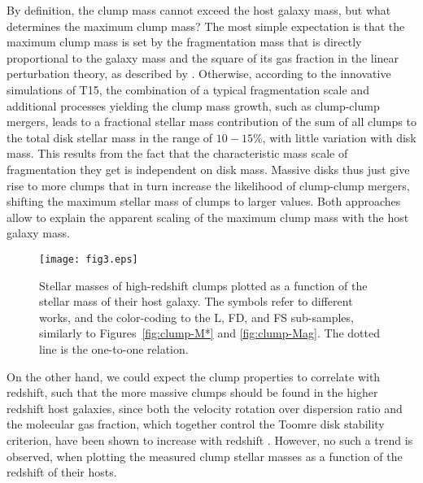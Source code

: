 \documentclass[twocolumn]{aastex61}
\begin{document}
By definition, the clump mass cannot exceed the host galaxy mass, but what 
determines the maximum clump mass? The most simple expectation is that the 
maximum clump mass is set by the fragmentation mass that is directly 
proportional to the galaxy mass and the square of its gas fraction in the linear 
perturbation theory, as described by \citet{escala08}. Otherwise, according to 
the innovative simulations of T15, the combination of a typical fragmentation 
scale and additional processes yielding the clump mass growth, such as 
clump-clump mergers, leads to a fractional stellar mass contribution of the sum 
of all clumps to the total disk stellar mass in the range of $10-15$\%, with 
little variation with disk mass. 
This results from the fact that the characteristic mass scale of fragmentation 
they get is independent on disk mass. 
Massive disks thus just give rise to more clumps that in turn increase the 
likelihood of clump-clump mergers, shifting the maximum stellar mass of clumps 
to larger values. 
Both approaches allow to explain the apparent scaling of the maximum clump 
mass with the host galaxy mass.

%

\begin{figure}
\centering
\texttt{[image: fig3.eps]}\hspace{1cm}
\caption{Stellar masses of high-redshift clumps plotted as a function of the stellar mass of their host galaxy. The symbols refer to different works, and the color-coding to the L, FD, and FS sub-samples, similarly to Figures~\ref{fig:clump-M*} and \ref{fig:clump-Mag}. The dotted line is the one-to-one relation.}
\label{fig:clump-host}
\end{figure}
%

On the other hand, we could expect the clump properties to correlate with 
redshift, such that the more massive clumps should be found in the higher 
redshift host galaxies, since both the velocity rotation over dispersion ratio 
and the molecular gas fraction, which together control the Toomre disk stability 
criterion, have been shown to increase with redshift
\citep{wisnioski15,dessauges15}. However, no such a trend is observed, when plotting the measured clump stellar masses as a function of the redshift of their hosts.
\end{document}
